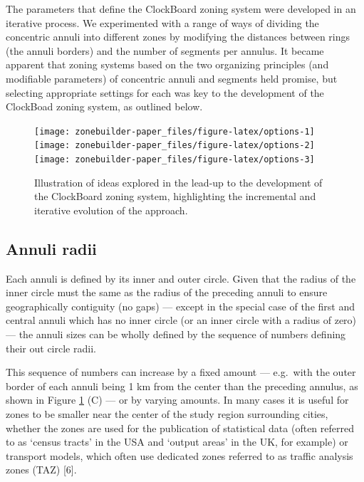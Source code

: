 \documentclass{josis}
\begin{document}
The parameters that define the ClockBoard zoning system were developed in an iterative process.
We experimented with a range of ways of dividing the concentric annuli into different zones by modifying the distances between rings (the annuli borders) and the number of segments per annulus.
It became apparent that zoning systems based on the two organizing principles (and modifiable parameters) of concentric annuli and segments held promise, but selecting appropriate settings for each was key to the development of the ClockBoad zoning system, as outlined below.

\begin{figure}

{\centering \texttt{[image: zonebuilder-paper\_files/figure-latex/options-1]} \texttt{[image: zonebuilder-paper\_files/figure-latex/options-2]} \texttt{[image: zonebuilder-paper\_files/figure-latex/options-3]} 

}

\caption{Illustration of ideas explored in the lead-up to the development of the ClockBoard zoning system, highlighting the incremental and iterative evolution of the approach.}\label{fig:options}
\end{figure}

\hypertarget{annuli-radii}{%
\subsection{Annuli radii}\label{annuli-radii}}

Each annuli is defined by its inner and outer circle.
Given that the radius of the inner circle must the same as the radius of the preceding annuli to ensure geographically contiguity (no gaps) --- except in the special case of the first and central annuli which has no inner circle (or an inner circle with a radius of zero) --- the annuli sizes can be wholly defined by the sequence of numbers defining their out circle radii.

This sequence of numbers can increase by a fixed amount --- e.g.~with the outer border of each annuli being 1 km from the center than the preceding annulus, as shown in Figure \ref{fig:options} (C) --- or by varying amounts.
In many cases it is useful for zones to be smaller near the center of the study region surrounding cities, whether the zones are used for the publication of statistical data (often referred to as `census tracts' in the USA and `output areas' in the UK, for example) or transport models, which often use dedicated zones referred to as traffic analysis zones (TAZ) {[}6{]}.
\end{document}
